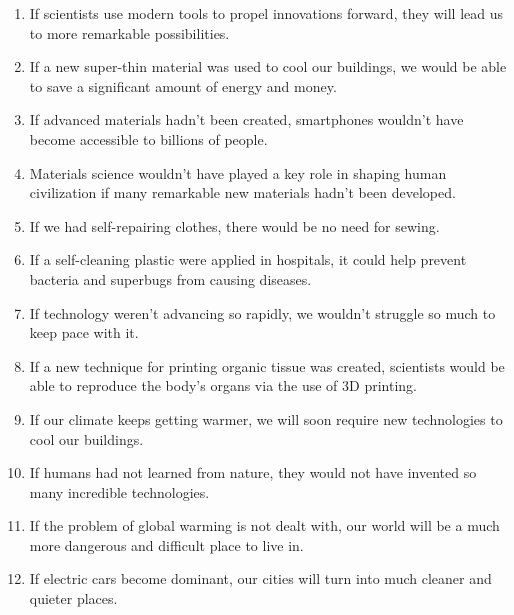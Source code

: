 \begin{enumerate}
      \item If scientists use modern tools to propel innovations forward, they will lead us to more remarkable possibilities.
      \item If a new super-thin material was used to cool our buildings, we would be able to save a significant amount of energy and money.
      \item If advanced materials hadn’t been created, smartphones wouldn’t have become accessible to billions of people.
      \item Materials science wouldn’t have played a key role in shaping human civilization if many remarkable new materials hadn’t been developed.
      \item If we had self-repairing clothes, there would be no need for sewing.
      \item If a self-cleaning plastic were applied in hospitals, it could help prevent bacteria and superbugs from causing diseases.
      \item If technology weren’t advancing so rapidly, we wouldn’t struggle so much to keep pace with it.
      \item If a new technique for printing organic tissue was created, scientists would be able to reproduce the body’s organs via the use of 3D printing.
      \item If our climate keeps getting warmer, we will soon require new technologies to cool our buildings.
      \item If humans had not learned from nature, they would not have invented so many incredible technologies.
      \item If the problem of global warming is not dealt with, our world will be a much more dangerous and difficult place to live in.
      \item If electric cars become dominant, our cities will turn into much cleaner and quieter places.
\end{enumerate}

